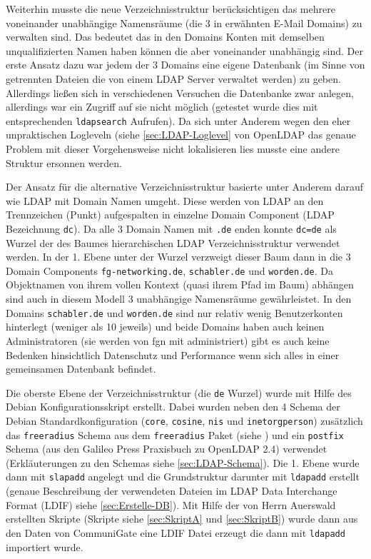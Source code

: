 \documentclass[11pt,a4paper,titlepage=firstiscover]{scrartcl} %
\begin{document}
Weiterhin musste die neue Verzeichnisstruktur ber\"ucksichtigen das mehrere voneinander unabh\"angige Namensr\"aume (die 3 in  erw\"ahnten E-Mail Domains) zu verwalten sind. Das bedeutet das in den Domains Konten mit demselben unqualifizierten Namen haben k\"onnen die aber voneinander unabh\"angig sind. Der erste Ansatz dazu war jedem der 3 Domains eine eigene Datenbank (im Sinne von getrennten Dateien die von einem LDAP Server verwaltet werden) zu geben. Allerdings lie\ss{}en sich in verschiedenen Versuchen die Datenbanke zwar anlegen, allerdings war ein Zugriff auf sie nicht m\"oglich (getestet wurde dies mit entsprechenden \texttt{ldapsearch} Aufrufen). Da sich unter Anderem wegen den eher unpraktischen Logleveln (siehe \autoref{sec:LDAP-Loglevel} von OpenLDAP das genaue Problem mit dieser Vorgehensweise nicht lokalisieren lies musste eine andere Struktur ersonnen werden.

Der Ansatz f\"ur die alternative Verzeichnisstruktur basierte unter Anderem darauf wie LDAP mit Domain Namen umgeht. Diese werden von LDAP an den Trennzeichen (Punkt) aufgespalten in einzelne Domain Component (LDAP Bezeichnung \texttt{dc}). Da alle 3 Domain Namen mit \texttt{.de} enden konnte \texttt{dc=de} als Wurzel der des Baumes hierarchischen LDAP Verzeichnisstruktur verwendet werden. In der 1. Ebene unter der Wurzel verzweigt dieser Baum dann in die 3 Domain Components  \texttt{fg-networking.de}, \texttt{schabler.de} und \texttt{worden.de}. Da Objektnamen von ihrem vollen Kontext (quasi ihrem Pfad im Baum) abh\"angen sind auch in diesem Modell 3 unabh\"angige Namensr\"aume gew\"ahrleistet. In den Domains \texttt{schabler.de} und \texttt{worden.de} sind nur relativ wenig Benutzerkonten hinterlegt (weniger als 10 jeweils) und beide Domains haben auch keinen Administratoren (sie werden von fgn mit administriert) gibt es auch keine Bedenken hinsichtlich Datenschutz und Performance wenn sich alles in einer gemeinsamen Datenbank befindet.

Die oberste Ebene der Verzeichnisstruktur (die \texttt{de} Wurzel) wurde mit Hilfe des Debian Konfigurationsskript erstellt. Dabei wurden neben den 4 Schema der Debian Standardkonfiguration (\texttt{core}, \texttt{cosine}, \texttt{nis} und \texttt{inetorgperson}) zus\"atzlich das \texttt{freeradius} Schema aus dem \texttt{freeradius} Paket (siehe ) und ein \texttt{postfix} Schema (aus den Galileo Press Praxisbuch zu OpenLDAP 2.4) verwendet (Erkl\"auterungen zu den Schemas siehe \autoref{sec:LDAP-Schema}). Die 1. Ebene wurde dann mit \texttt{slapadd} angelegt und die Grundstruktur darunter mit \texttt{ldapadd} erstellt (genaue Beschreibung der verwendeten Dateien im LDAP Data Interchange Format (LDIF) siehe \autoref{sec:Erstelle-DB}). Mit Hilfe der von Herrn Auerswald erstellten Skripte (Skripte siehe \autoref{sec:SkriptA} und \autoref{sec:SkriptB}) wurde dann aus den Daten von CommuniGate eine LDIF Datei erzeugt die dann mit \texttt{ldapadd} importiert wurde.
\end{document}
